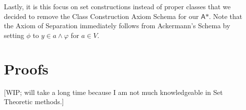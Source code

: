 \documentclass{article}
\begin{document}
Lastly, it is this focus on set constructions instead of proper classes that we decided to remove the Class Construction Axiom Schema for our $\textsf{A*}$. Note that the Axiom of Separation immediately follows from Ackermann's Schema by setting $\phi$ to $y \in a \wedge \varphi$ for $a\in V$.






\appendix

\section{Proofs}\label{proofs}
[WIP; will take a long time because I am not much knowledgeable in Set Theoretic methods.]
\end{document}
